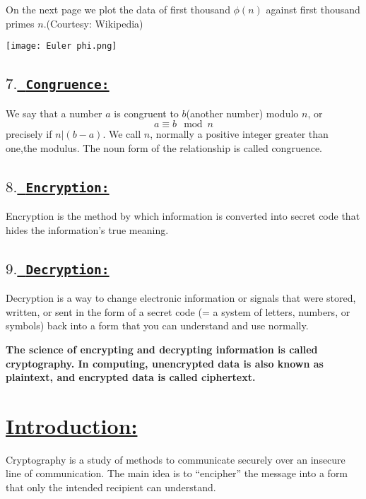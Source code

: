 \documentclass[a4paper,12pt]{article}
\begin{document}
    On the next page we plot the data of first thousand $\phi(n)$ against first thousand primes $n$.(Courtesy: Wikipedia)

    \begin{center}
        \texttt{[image: Euler phi.png]}
    \end{center}

    \subsection*{\underline{$7.$\ \texttt{\textbf{Congruence:}}}} 

    We say that a number $a$ is congruent to $b$(another number) modulo $n$, or
    $$ a \equiv b \mod{n} $$
    precisely if $n | (b - a)$. We call $n$, normally a positive integer greater than one,the modulus. The noun form of the relationship is called congruence.

    \subsection*{\underline{$8.$\ \texttt{\textbf{Encryption:}}}} 

    Encryption is the method by which information is converted into secret code that hides the information's true meaning.

    \subsection*{\underline{$9.$\ \texttt{\textbf{Decryption:}}}} 

    Decryption is a way to change electronic information or signals that were stored, written, or sent in the form of a secret code (= a system of letters, numbers, or symbols) back into a form that you can understand and use normally.

    \begin{tcolorbox}[title=NOTE ]
        {\bf The science of encrypting and decrypting information is called cryptography. In computing, unencrypted data is also known as plaintext, and encrypted data is called ciphertext.}
    \end{tcolorbox}
    

    \section*{\underline{Introduction:}}

    Cryptography is a study of methods to communicate securely over an insecure line of communication. The main idea is to “encipher” the message into a form that only the intended recipient can understand. 
\end{document}
